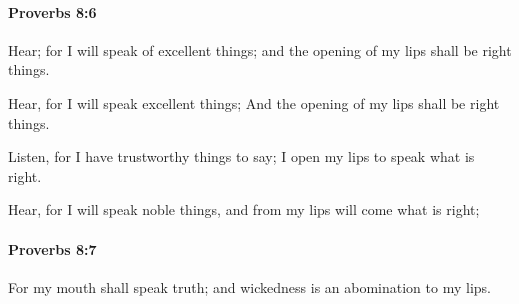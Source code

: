 		\paragraph{Proverbs 8:6} %
			\label{PROVERBS-8-6}

			Hear; for I will speak of excellent things; and the opening of my lips shall be right things.

			\begin{versebox}
					\item[BHS] 
					\item[ASV] Hear, for I will speak excellent things; And the opening of my lips shall be right things.
					\item[NIV] Listen, for I have trustworthy things to say; I open my lips to speak what is right.
					\item[NRSV] Hear, for I will speak noble things, and from my lips will come what is right;
			\end{versebox}

		\paragraph{Proverbs 8:7} %
			\label{PROVERBS-8-7}

			For my mouth shall speak truth; and wickedness is an abomination to my lips.

